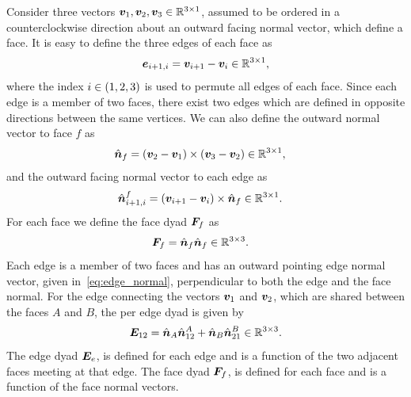 Consider three vectors \( \bm{v}_1, \bm{v}_2, \bm{v}_3 \in \mathbb{R}^{3 \times 1} \), assumed to be ordered in a counterclockwise direction about an outward facing normal vector, which define a face.
It is easy to define the three edges of each face as
\begin{align}\label{eq:edges}
    \bm{e}_{i+1,i} = \bm{v}_{i+1} - \bm{v}_i \in \mathbb{R}^{3 \times 1 },
\end{align}
where the index \( i \in \left( 1,2,3 \right) \) is used to permute all edges of each face.
Since each edge is a member of two faces, there exist two edges which are defined in opposite directions between the same vertices.
We can also define the outward normal vector to face \( f\)  as
\begin{align}\label{eq:face_normal}
    \hat{\bm{n}}_f &= \left( \bm{v}_{2} - \bm{v}_1 \right) \times \left( \bm{v}_{3} - \bm{v}_2 \right) \in \mathbb{R}^{3 \times 1},
\end{align}
and the outward facing normal vector to each edge as
\begin{align}\label{eq:edge_normal}
    \hat{\bm{n}}_{i+1,i}^f &= \left( \bm{v}_{i+1} - \bm{v}_i \right) \times \hat{\bm{n}}_f \in \mathbb{R}^{3 \times 1}.
\end{align}
For each face we define the face dyad \( \bm{F}_f \) as
\begin{align}\label{eq:face_dyad}
    \bm{F}_f &= \hat{\bm{n}}_f \hat{\bm{n}}_f \in \mathbb{R}^{3 \times 3}.
\end{align}
Each edge is a member of two faces and has an outward pointing edge normal vector, given in~\cref{eq:edge_normal}, perpendicular to both the edge and the face normal.
For the edge connecting the vectors \( \bm{v}_1 \) and \( \bm{v}_2 \), which are shared between the faces \(A\) and \( B\), the per edge dyad is given by
\begin{align}\label{eq:edge_dyad}
    \bm{E}_{12} = \hat{\bm{n}}_A \hat{\bm{n}}_{12}^A + \hat{\bm{n}}_B \hat{\bm{n}}_{21}^B \in \mathbb{R}^{3 \times 3}.
\end{align}
The edge dyad \( \bm{E}_e  \), is defined for each edge and is a function of the two adjacent faces meeting at that edge.
The face dyad \( \bm{F}_f \), is defined for each face and is a function of the face normal vectors.

